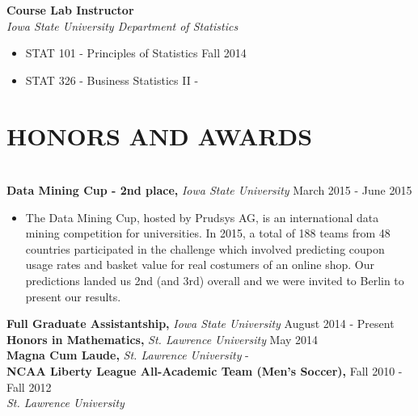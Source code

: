 \documentclass{res} %
\begin{document}
\begin{resume}
{\bf Course Lab Instructor} \\
{\sl Iowa State University Department of Statistics}
\begin{itemize} \itemsep -2pt 
\item STAT 101 - Principles of Statistics \hfill Fall 2014
\item STAT 326 - Business Statistics II \hfill -
\end{itemize}



%


\section{HONORS AND AWARDS}

\hrulefill \\
{\bf Data Mining Cup - 2nd place,} {\sl Iowa State University} \hfill March 2015 -
June 2015 
\begin{itemize} \itemsep -2pt
  \item The Data Mining Cup, hosted by Prudsys AG, is an international data
    mining competition for universities. In 2015, a total of 188 teams from 48
    countries participated in the challenge which involved predicting coupon
    usage rates and basket value for real costumers of an online shop. Our
    predictions landed us 2nd (and 3rd) overall and we were invited to Berlin to
    present our results.
\end{itemize}
\vspace{-1em}
{\bf Full Graduate Assistantship,} {\sl Iowa State University} \hfill August 2014 - Present \\
{\bf Honors in Mathematics,} {\sl St. Lawrence University} \hfill May 2014 \\
{\bf Magna Cum Laude,} {\sl St. Lawrence University} \hfill - \\
{\bf NCAA Liberty League All-Academic Team (Men's Soccer),} \hfill Fall 2010 -
Fall 2012 \\
{\sl St. Lawrence University} 


\end{resume}
\end{document}
